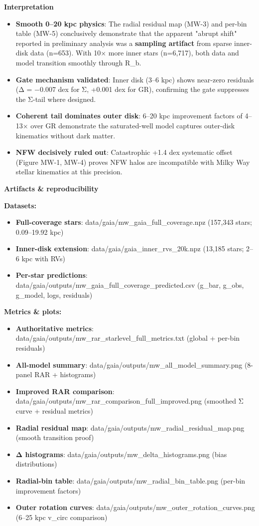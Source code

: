 \documentclass[11pt,a4paper]{article}
\begin{document}
\textbf{Interpretation}

\begin{itemize}
\item \textbf{Smooth 0–20 kpc physics}: The radial residual map (MW-3) and per-bin table (MW-5) conclusively demonstrate that the apparent "abrupt shift" reported in preliminary analysis was a \textbf{sampling artifact} from sparse inner-disk data (n=653). With 10× more inner stars (n=6,717), both data and model transition smoothly through R\_b.
\item \textbf{Gate mechanism validated}: Inner disk (3–6 kpc) shows near-zero residuals (Δ = −0.007 dex for Σ, +0.001 dex for GR), confirming the gate suppresses the Σ-tail where designed.
\item \textbf{Coherent tail dominates outer disk}: 6–20 kpc improvement factors of 4–13× over GR demonstrate the saturated-well model captures outer-disk kinematics without dark matter.
\item \textbf{NFW decisively ruled out}: Catastrophic +1.4 dex systematic offset (Figure MW-1, MW-4) proves NFW halos are incompatible with Milky Way stellar kinematics at this precision.
\end{itemize}


\textbf{Artifacts \& reproducibility}


\textbf{Datasets:}

\begin{itemize}
\item \textbf{Full-coverage stars}: data/gaia/mw\_gaia\_full\_coverage.npz (157,343 stars; 0.09–19.92 kpc)
\item \textbf{Inner-disk extension}: data/gaia/gaia\_inner\_rvs\_20k.npz (13,185 stars; 2–6 kpc with RVs)
\item \textbf{Per-star predictions}: data/gaia/outputs/mw\_gaia\_full\_coverage\_predicted.csv (g\_bar, g\_obs, g\_model, logs, residuals)
\end{itemize}


\textbf{Metrics \& plots:}

\begin{itemize}
\item \textbf{Authoritative metrics}: data/gaia/outputs/mw\_rar\_starlevel\_full\_metrics.txt (global + per-bin residuals)
\item \textbf{All-model summary}: data/gaia/outputs/mw\_all\_model\_summary.png (8-panel RAR + histograms)
\item \textbf{Improved RAR comparison}: data/gaia/outputs/mw\_rar\_comparison\_full\_improved.png (smoothed Σ curve + residual metrics)
\item \textbf{Radial residual map}: data/gaia/outputs/mw\_radial\_residual\_map.png (smooth transition proof)
\item \textbf{Δ histograms}: data/gaia/outputs/mw\_delta\_histograms.png (bias distributions)
\item \textbf{Radial-bin table}: data/gaia/outputs/mw\_radial\_bin\_table.png (per-bin improvement factors)
\item \textbf{Outer rotation curves}: data/gaia/outputs/mw\_outer\_rotation\_curves.png (6–25 kpc v\_circ comparison)
\end{itemize}
\end{document}
